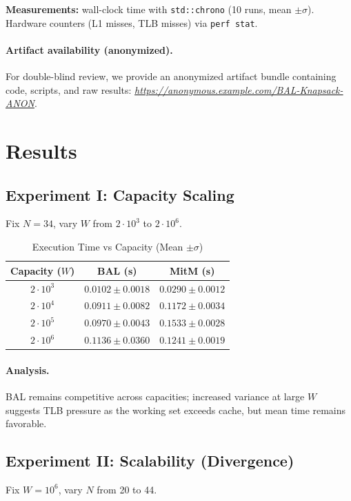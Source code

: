 \documentclass[a4paper,USenglish]{lipics-v2021}
\begin{document}
\textbf{Measurements:} wall-clock time with \texttt{std::chrono} (10 runs, mean $\pm\sigma$). Hardware counters (L1 misses, TLB misses) via \texttt{perf stat}.

\paragraph*{Artifact availability (anonymized).}
For double-blind review, we provide an anonymized artifact bundle containing code, scripts, and raw results:
\emph{\url{https://anonymous.example.com/BAL-Knapsack-ANON}}.

\section{Results}
\subsection{Experiment I: Capacity Scaling}
Fix $N=34$, vary $W$ from $2\cdot 10^3$ to $2\cdot 10^6$.

\begin{table}[t]
\centering
\caption{Execution Time vs Capacity (Mean $\pm\sigma$)}
\label{tab:time}
\begin{tabular}{@{}ccc@{}}
\toprule
Capacity ($W$) & BAL (s) & MitM (s) \\
\midrule
$2 \cdot 10^3$ & $0.0102 \pm 0.0018$ & $0.0290 \pm 0.0012$ \\
$2 \cdot 10^4$ & $0.0911 \pm 0.0082$ & $0.1172 \pm 0.0034$ \\
$2 \cdot 10^5$ & $0.0970 \pm 0.0043$ & $0.1533 \pm 0.0028$ \\
$2 \cdot 10^6$ & $0.1136 \pm 0.0360$ & $0.1241 \pm 0.0019$ \\
\bottomrule
\end{tabular}
\end{table}

\paragraph*{Analysis.}
BAL remains competitive across capacities; increased variance at large $W$ suggests TLB pressure as the working set exceeds cache, but mean time remains favorable.

\subsection{Experiment II: Scalability (Divergence)}
Fix $W=10^6$, vary $N$ from 20 to 44.
\end{document}
